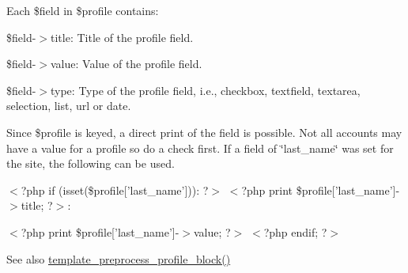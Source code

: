 Each \$field in \$profile contains:
\begin{DoxyItemize}
\item \$field-\/$>$title: Title of the profile field.
\item \$field-\/$>$value: Value of the profile field.
\item \$field-\/$>$type: Type of the profile field, i.e., checkbox, textfield, textarea, selection, list, url or date.
\end{DoxyItemize}

Since \$profile is keyed, a direct print of the field is possible. Not all accounts may have a value for a profile so do a check first. If a field of \char`\"{}last\_\-name\char`\"{} was set for the site, the following can be used.

$<$?php if (isset(\$profile\mbox{[}'last\_\-name'\mbox{]})): ?$>$  $<$?php print \$profile\mbox{[}'last\_\-name'\mbox{]}-\/$>$title; ?$>$:\par
 $<$?php print \$profile\mbox{[}'last\_\-name'\mbox{]}-\/$>$value; ?$>$  $<$?php endif; ?$>$

\begin{DoxySeeAlso}{See also}
\hyperlink{profile_8module_ac67229ab98fe8f88094d3db5e7918040}{template\_\-preprocess\_\-profile\_\-block()} 
\end{DoxySeeAlso}
